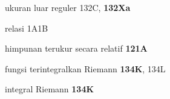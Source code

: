 ukuran luar reguler 132C, {\bf 132Xa}











relasi 1A1B
































himpunan terukur secara relatif {\bf 121A}
















































fungsi terintegralkan Riemann {\bf 134K}, 134L

integral Riemann {\bf 134K}






